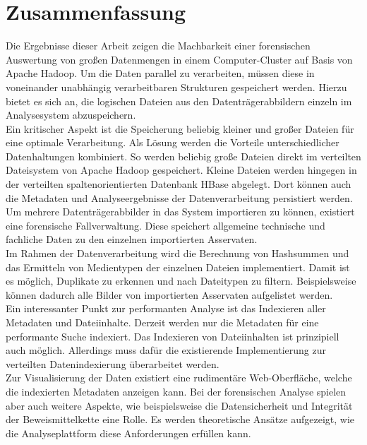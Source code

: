 \chapter{Zusammenfassung}
\label{ch:zusammenfassung}

Die Ergebnisse dieser Arbeit zeigen die Machbarkeit einer forensischen Auswertung von großen Datenmengen in einem Computer-Cluster auf Basis von Apache Hadoop. Um die Daten parallel zu verarbeiten, müssen diese in voneinander unabhängig verarbeitbaren Strukturen gespeichert werden. Hierzu bietet es sich an, die logischen Dateien aus den Datenträgerabbildern einzeln im Analysesystem abzuspeichern.\\
Ein kritischer Aspekt ist die Speicherung beliebig kleiner und großer Dateien für eine optimale Verarbeitung. Als Lösung werden die Vorteile unterschiedlicher Datenhaltungen kombiniert. So werden beliebig große Dateien direkt im verteilten Dateisystem von Apache Hadoop gespeichert. Kleine Dateien werden hingegen in der verteilten spaltenorientierten Datenbank HBase abgelegt. Dort können auch die Metadaten und Analyseergebnisse der Datenverarbeitung persistiert werden.\\
Um mehrere Datenträgerabbilder in das System importieren zu können, existiert eine forensische Fallverwaltung. Diese speichert allgemeine technische und fachliche Daten zu den einzelnen importierten Asservaten.\\

\noindent
Im Rahmen der Datenverarbeitung wird die Berechnung von Hashsummen und das Ermitteln von Medientypen der einzelnen Dateien implementiert. Damit ist es möglich, Duplikate zu erkennen und nach Dateitypen zu filtern. Beispielsweise können dadurch alle Bilder von importierten Asservaten aufgelistet werden.\\
Ein interessanter Punkt zur performanten Analyse ist das Indexieren aller Metadaten und Dateiinhalte. Derzeit werden nur die Metadaten für eine performante Suche indexiert. Das Indexieren von Dateiinhalten ist prinzipiell auch möglich. Allerdings  muss dafür die existierende Implementierung zur verteilten Datenindexierung überarbeitet werden.\\

\noindent
Zur Visualisierung der Daten existiert eine rudimentäre Web-Oberfläche, welche die indexierten Metadaten anzeigen kann. Bei der forensischen Analyse spielen aber auch weitere Aspekte, wie beispielsweise die Datensicherheit und Integrität der Beweismittelkette eine Rolle. Es werden theoretische Ansätze aufgezeigt, wie die Analyseplattform diese Anforderungen erfüllen kann.\\

